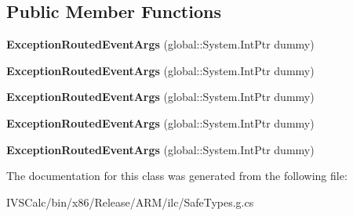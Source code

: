 \subsection*{Public Member Functions}
\begin{DoxyCompactItemize}
\item 
\mbox{\label{class_windows_1_1_u_i_1_1_xaml_1_1_exception_routed_event_args_a04cef090303e5ffdcaa1fbb56ac333cc}} 
{\bfseries Exception\+Routed\+Event\+Args} (global\+::\+System.\+Int\+Ptr dummy)
\item 
\mbox{\label{class_windows_1_1_u_i_1_1_xaml_1_1_exception_routed_event_args_a04cef090303e5ffdcaa1fbb56ac333cc}} 
{\bfseries Exception\+Routed\+Event\+Args} (global\+::\+System.\+Int\+Ptr dummy)
\item 
\mbox{\label{class_windows_1_1_u_i_1_1_xaml_1_1_exception_routed_event_args_a04cef090303e5ffdcaa1fbb56ac333cc}} 
{\bfseries Exception\+Routed\+Event\+Args} (global\+::\+System.\+Int\+Ptr dummy)
\item 
\mbox{\label{class_windows_1_1_u_i_1_1_xaml_1_1_exception_routed_event_args_a04cef090303e5ffdcaa1fbb56ac333cc}} 
{\bfseries Exception\+Routed\+Event\+Args} (global\+::\+System.\+Int\+Ptr dummy)
\item 
\mbox{\label{class_windows_1_1_u_i_1_1_xaml_1_1_exception_routed_event_args_a04cef090303e5ffdcaa1fbb56ac333cc}} 
{\bfseries Exception\+Routed\+Event\+Args} (global\+::\+System.\+Int\+Ptr dummy)
\end{DoxyCompactItemize}


The documentation for this class was generated from the following file\+:\begin{DoxyCompactItemize}
\item 
I\+V\+S\+Calc/bin/x86/\+Release/\+A\+R\+M/ilc/Safe\+Types.\+g.\+cs\end{DoxyCompactItemize}
